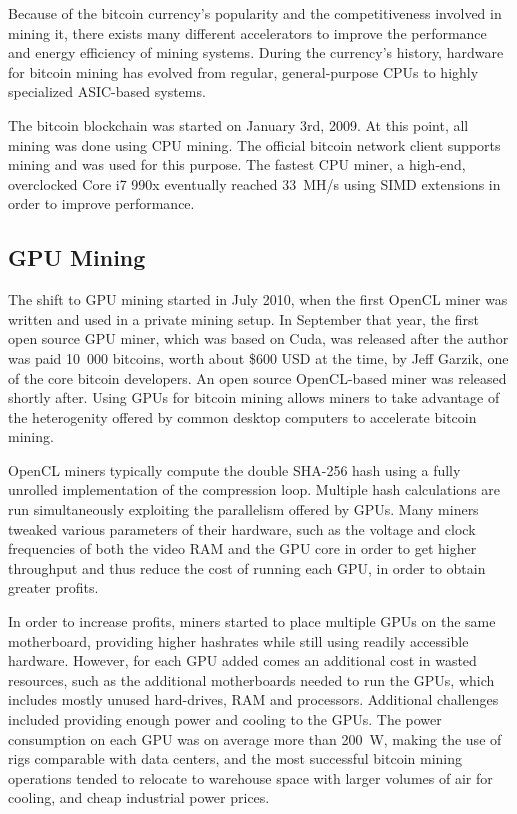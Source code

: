 Because of the bitcoin currency's popularity and the competitiveness involved in mining it, there exists
many different accelerators to improve the performance and energy efficiency of mining systems.
During the currency's history, hardware for bitcoin mining has evolved from regular, general-purpose
CPUs to highly specialized ASIC-based systems.

The bitcoin blockchain was started on January 3rd, 2009. At this point, all mining was done
using CPU mining. The official bitcoin network client supports mining and was used for this
purpose. The fastest CPU miner, a high-end, overclocked Core i7 990x eventually reached 33~MH/s
using SIMD extensions in order to improve performance. \cite{bitcoin-history}

\subsection{GPU Mining}
The shift to GPU mining started in July 2010, when the first OpenCL miner was written and
used in a private mining setup. In September that year, the first open source GPU miner,
which was based on Cuda, was released after the author was paid 10~000 bitcoins, worth about
\$600 USD at the time, by Jeff Garzik, one of the core bitcoin developers. An open source
OpenCL-based miner was released shortly after. Using GPUs for bitcoin mining allows miners to
take advantage of the heterogenity offered by common desktop computers to accelerate bitcoin
mining. \cite{bitcoin-history}

OpenCL miners typically compute the double SHA-256 hash using a fully unrolled implementation
of the compression loop. Multiple hash calculations are run simultaneously exploiting the parallelism
offered by GPUs. Many miners tweaked various parameters of their hardware, such as the voltage and
clock frequencies of both the video RAM and the GPU core in order to get higher throughput
and thus reduce the cost of running each GPU, in order to obtain greater profits.

In order to increase profits, miners started to place multiple GPUs on the same motherboard,
providing higher hashrates while still using readily accessible hardware. However, for each
GPU added comes an additional cost in wasted resources, such as the additional motherboards needed
to run the GPUs, which includes mostly unused hard-drives, RAM and processors.
Additional challenges included providing enough power and cooling to the GPUs.
The power consumption on each GPU was on average more than 200~W, making the use of rigs
comparable with data centers, and the most successful bitcoin mining operations tended to
relocate to warehouse space with larger volumes of air for cooling, and cheap industrial power prices. \cite{bespoke-silicon}

